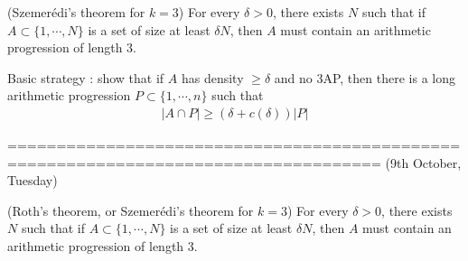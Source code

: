 \documentclass[12pt,a4paper]{report}
\begin{document}
(Szemer\'{e}di's theorem for $k=3$) For every $\delta >0$, there exists $N$ such that if $A \subset \{1, \cdots, N\}$ is a set of size at least $\delta N$, then $A$ must contain an arithmetic progression of length 3. 

\s

Basic strategy : show that if $A$ has density $\geq \delta$ and no 3AP, then there is a long arithmetic progression $P \subset \{1,\cdots,n\}$ such that
\begin{align*}
|A\cap P| \geq (\delta + c(\delta)) |P|
\end{align*}

====================================================================================
(9th October, Tuesday)
\s

(Roth's theorem, or Szemer\'{e}di's theorem for $k=3$) For every $\delta >0$, there exists $N$ such that if $A \subset \{1, \cdots, N\}$ is a set of size at least $\delta N$, then $A$ must contain an arithmetic progression of length 3. 
\s
\end{document}
